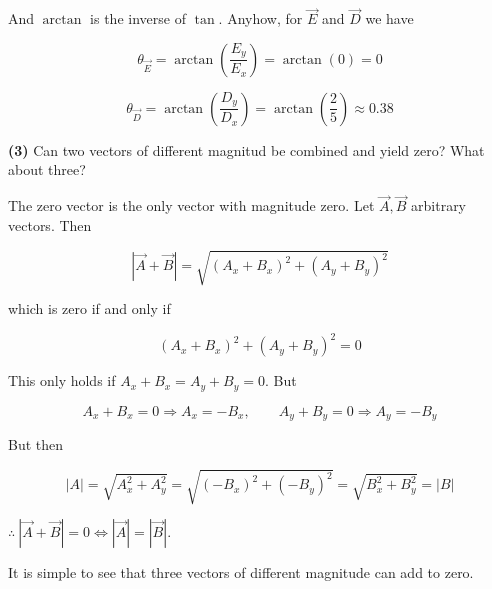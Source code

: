 \documentclass[12pt]{article}
\theoremstyle{definition}
\begin{document}
And $\arctan$ is the inverse of $\tan$. Anyhow, for $\overrightarrow{E}$ and
$\overrightarrow{D}$ we have 

\begin{equation*}
    \theta_{\overrightarrow{E}} = \arctan\left( \frac{E_y}{E_x} \right) =
    \arctan\left( 0 \right) = 0
\end{equation*}

\begin{equation*}
    \theta_{\overrightarrow{D}} = \arctan\left( \frac{D_y}{D_x} \right) =
    \arctan \left( \frac{2}{5} \right) \approx 0.38
\end{equation*}

\pagebreak 

\begin{shaded}
    \textbf{(3)} Can two vectors of different magnitud be combined and yield zero? What about three?
\end{shaded}

The zero vector is the only vector with magnitude zero. Let $\overrightarrow{A},
\overrightarrow{B}$ arbitrary vectors. Then 

\begin{equation*}
    \left| \overrightarrow{A} + \overrightarrow{B} \right| = \sqrt{(A_x + B_x)^2
    + (A_y + B_y)^2} 
\end{equation*}

which is zero if and only if 

\begin{equation*}
    ( A_x + B_x )^2 + ( A_y + B_y )^2 = 0
\end{equation*}

This only holds if $A_x + B_x = A_y + B_y = 0$. But 

\begin{equation*}
    A_x + B_x = 0 \Rightarrow A_x = -B_x, \qquad A_y + B_y = 0 \Rightarrow A_y =
    -B_y
\end{equation*}

But then 

\begin{equation*}
    \left| A \right| = \sqrt{A_x^2 + A_y^2} = \sqrt{(-B_x)^2 + (-B_y)^2} =
    \sqrt{B_x^2 + B_y^2}  = \left| B \right| 
\end{equation*} 

$\therefore ~ \left| \overrightarrow{A} + \overrightarrow{B} \right| = 0 \iff
\left| \overrightarrow{A} \right| = \left| \overrightarrow{B} \right| $.

It is simple to see that three vectors of different magnitude can add to zero.
\end{document}
